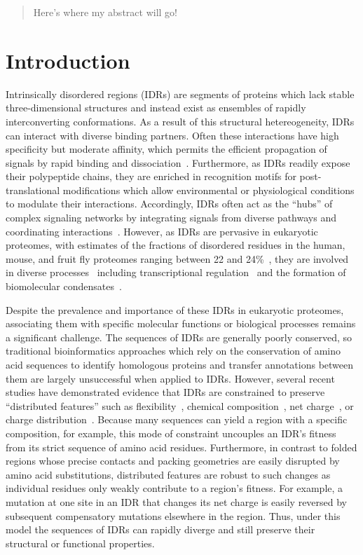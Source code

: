 \begin{abstract}
\noindent
Here's where my abstract will go!
\end{abstract}

\section{Introduction}
Intrinsically disordered regions (IDRs) are segments of proteins which lack stable three-dimensional structures and instead exist as ensembles of rapidly interconverting conformations. As a result of this structural hetereogeneity, IDRs can interact with diverse binding partners. Often these interactions have high specificity but moderate affinity, which permits the efficient propagation of signals by rapid binding and dissociation~\cite{Zhou2012, Wright2014}. Furthermore, as IDRs readily expose their polypeptide chains, they are enriched in recognition motifs for post-translational modifications which allow environmental or physiological conditions to modulate their interactions. Accordingly, IDRs often act as the ``hubs'' of complex signaling networks by integrating signals from diverse pathways and coordinating interactions~\cite{Dunker2005, Buljan2012}. However, as IDRs are pervasive in eukaryotic proteomes, with estimates of the fractions of disordered residues in the human, mouse, and fruit fly proteomes ranging between 22 and 24\%~\cite{Piovesan2020, Piovesan2022}, they are involved in diverse processes~\cite{vanderLee2014} including transcriptional regulation~\cite{Liu2006} and the formation of biomolecular condensates~\cite{Banani2017}.

Despite the prevalence and importance of these IDRs in eukaryotic proteomes, associating them with specific molecular functions or biological processes remains a significant challenge. The sequences of IDRs are generally poorly conserved, so traditional bioinformatics approaches which rely on the conservation of amino acid sequences to identify homologous proteins and transfer annotations between them are largely unsuccessful when applied to IDRs. However, several recent studies have demonstrated evidence that IDRs are constrained to preserve ``distributed features'' such as flexibility~\cite{Daughdrill2007}, chemical composition~\cite{Moesa2012}, net charge~\cite{Zarin2017}, or charge distribution~\cite{Beh2012}. Because many sequences can yield a region with a specific composition, for example, this mode of constraint uncouples an IDR's fitness from its strict sequence of amino acid residues. Furthermore, in contrast to folded regions whose precise contacts and packing geometries are easily disrupted by amino acid substitutions, distributed features are robust to such changes as individual residues only weakly contribute to a region's fitness. For example, a mutation at one site in an IDR that changes its net charge is easily reversed by subsequent compensatory mutations elsewhere in the region. Thus, under this model the sequences of IDRs can rapidly diverge and still preserve their structural or functional properties.

